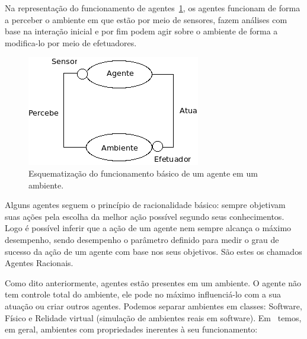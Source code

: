 Na representação do funcionamento de agentes~\ref{fig:agente-basico}, os agentes funcionam de forma a perceber o ambiente em que estão por meio de sensores, fazem análises com base na interação inicial e por fim podem agir sobre o ambiente de forma a modifica-lo por meio de efetuadores.

\begin{figure}
	\centering
	\includegraphics[scale=0.75]{images/agente-basico.png}
	\caption{Esquematização do funcionamento básico de um agente em um ambiente.}
	\label{fig:agente-basico}
\end{figure}

Alguns agentes seguem o princípio de racionalidade básico: sempre objetivam suas ações pela escolha da melhor ação possível segundo seus conhecimentos. Logo é possível inferir que a ação de um agente nem sempre alcança o máximo desempenho, sendo desempenho o parâmetro definido para medir o grau de sucesso da ação de um agente com base nos seus objetivos. São estes os chamados Agentes Racionais.

Como dito anteriormente, agentes estão presentes em um ambiente. O agente não tem controle total do ambiente, ele pode no máximo influenciá-lo com a sua atuação ou criar outros agentes. Podemos separar ambientes em classes: Software, Físico e Relidade virtual (simulação de ambientes reais em software). Em~\cite{wooldridge04} temos, em geral, ambientes com propriedades inerentes à seu funcionamento:

